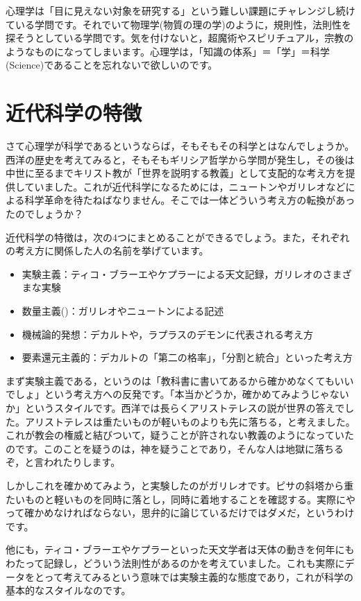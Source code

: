 \documentclass{ltjsbook}
\begin{document}
心理学は「目に見えない対象を研究する」という難しい課題にチャレンジし続けている学問です。それでいて物理学(物質の理の学)のように，規則性，法則性を探そうとしている学問です。気を付けないと，超魔術やスピリチュアル，宗教のようなものになってしまいます。心理学は，「知識の体系」＝「学」＝科学(Science)であることを忘れないで欲しいのです。

\section{近代科学の特徴}

さて心理学が科学であるというならば，そもそもその科学とはなんでしょうか。西洋の歴史を考えてみると，そもそもギリシア哲学から学問が発生し，その後は中世に至るまでキリスト教が「世界を説明する教義」として支配的な考え方を提供していました。これが近代科学になるためには，ニュートンやガリレオなどによる科学革命を待たねばなりません。そこでは一体どういう考え方の転換があったのでしょうか？

近代科学の特徴は，次の4つにまとめることができるでしょう。また，それぞれの考え方に関係した人の名前を挙げています。
\begin{itemize}
	\item 実験主義：ティコ・ブラーエやケプラーによる天文記録，ガリレオのさまざまな実験
	\item 数量主義()：ガリレオやニュートンによる記述
	\item 機械論的発想：デカルトや，ラプラスのデモンに代表される考え方
	\item 要素還元主義的：デカルトの「第二の格率」，「分割と統合」といった考え方
\end{itemize}

まず実験主義である，というのは「教科書に書いてあるから確かめなくてもいいでしょ」という考え方への反発です。「本当かどうか，確かめてみようじゃないか」というスタイルです。西洋では長らくアリストテレスの説が世界の答えでした。アリストテレスは重たいものが軽いものよりも先に落ちる，と考えました。これが教会の権威と結びついて，疑うことが許されない教義のようになっていたのです。このことを疑うのは，神を疑うことであり，そんな人は地獄に落ちるぞ，と言われたりします。

しかしこれを確かめてみよう，と実験したのがガリレオです。ピサの斜塔から重たいものと軽いものを同時に落とし，同時に着地することを確認する。実際にやって確かめなければならない，思弁的に論じているだけではダメだ，というわけです。

他にも，ティコ・ブラーエやケプラーといった天文学者は天体の動きを何年にもわたって記録し，どういう法則性があるのかを考えていました。これも実際にデータをとって考えてみるという意味では実験主義的な態度であり，これが科学の基本的なスタイルなのです。
\end{document}
